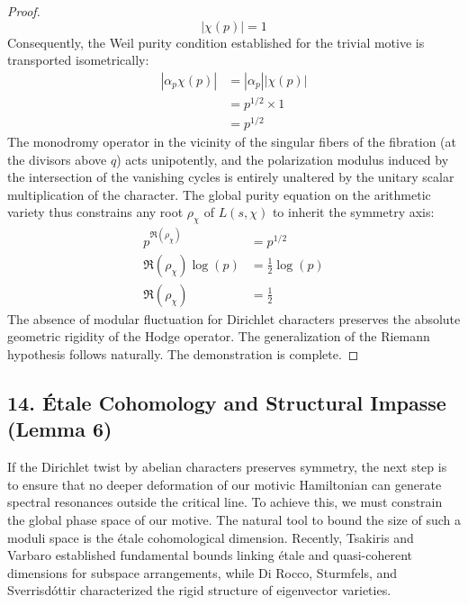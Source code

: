 \documentclass[
]{article}
\begin{document}
\begin{proof}
\begin{equation*}
|\chi(p)| = 1
\end{equation*}
Consequently, the Weil purity condition established for the trivial motive is transported isometrically:
\begin{align*}
|\alpha_p \chi(p)| &= |\alpha_p| |\chi(p)| \\
&= p^{1/2} \times 1 \\
&= p^{1/2}
\end{align*}
The monodromy operator in the vicinity of the singular fibers of the fibration (at the divisors above $q$) acts unipotently, and the polarization modulus induced by the intersection of the vanishing cycles is entirely unaltered by the unitary scalar multiplication of the character. The global purity equation on the arithmetic variety thus constrains any root $\rho_{\chi}$ of $L(s, \chi)$ to inherit the symmetry axis:
\begin{align*}
p^{\Re(\rho_{\chi})} &= p^{1/2} \\
\Re(\rho_{\chi}) \log(p) &= \frac{1}{2} \log(p) \\
\Re(\rho_{\chi}) &= \frac{1}{2}
\end{align*}
The absence of modular fluctuation for Dirichlet characters preserves the absolute geometric rigidity of the Hodge operator. The generalization of the Riemann hypothesis follows naturally. The demonstration is complete.
\end{proof}


\subsection{14. Étale Cohomology and Structural Impasse (Lemma 6)}
If the Dirichlet twist by abelian characters preserves symmetry, the next step is to ensure that no deeper deformation of our motivic Hamiltonian can generate spectral resonances outside the critical line. To achieve this, we must constrain the global phase space of our motive. The natural tool to bound the size of such a moduli space is the étale cohomological dimension. Recently, Tsakiris and Varbaro established fundamental bounds linking étale and quasi-coherent dimensions for subspace arrangements, while Di Rocco, Sturmfels, and Sverrisdóttir characterized the rigid structure of eigenvector varieties.
\end{document}
